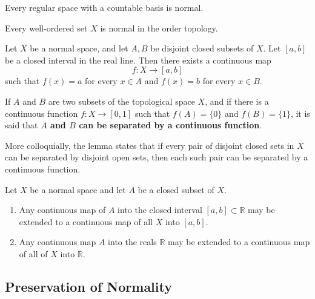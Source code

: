   \begin{theorem}
    Every regular space with a countable basis is normal. 
  \end{theorem}

  \begin{theorem}
    Every well-ordered set $X$ is normal in the order topology. 
  \end{theorem}

  \begin{theorem}
    Let $X$ be a normal space, and let $A, B$ be disjoint closed subsets of $X$. Let $[a,b]$ be a closed interval in the real line. Then there exists a continuous map
    \begin{equation}
      f: X \longrightarrow [a,b]
    \end{equation}
    such that $f(x) = a$ for every $x \in A$ and $f(x) = b$ for every $x \in B$. 
  \end{theorem}

  \begin{definition}
    If $A$ and $B$ are two subsets of the topological space $X$, and if there is a continuous function $f: X \longrightarrow [0,1]$ such that $f(A) = \{0\}$ and $f(B) = \{1\}$, it is said that \textbf{$A$ and $B$ can be separated by a continuous function}. 
  \end{definition}

  More colloquially, the lemma states that if every pair of disjoint closed sets in $X$ can be separated by disjoint open sets, then each such pair can be separated by a continuous function. 

  \begin{theorem}
    Let $X$ be a normal space and let $A$ be a closed subset of $X$. 
    \begin{enumerate}
      \item Any continuous map of $A$ into the closed interval $[a,b] \subset \mathbb{R}$ may be extended to a continuous map of all $X$ into $[a,b]$. 
      \item Any continuous map $A$ into the reals $\mathbb{R}$ may be extended to a continuous map of all of $X$ into $\mathbb{R}$. 
    \end{enumerate}
  \end{theorem}

\subsection{Preservation of Normality}

